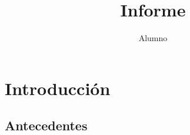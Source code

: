 \documentclass[a5paper]{report}
\title{Informe}
\author{Alumno}
\begin{document}
\maketitle

\chapter{Introducci\'on}

\kant[1-6]

\section{Antecedentes}
\kant[6-10]
\end{document}
